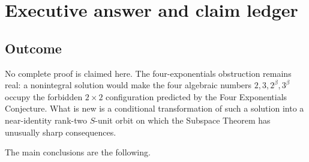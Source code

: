 \documentclass[11pt,oneside]{article}
\theoremstyle{definition}
\theoremstyle{remark}
\begin{document}
\tableofcontents
\clearpage

\section{Executive answer and claim ledger}
\label{sec:executive}

\subsection{Outcome}

No complete proof is claimed here.  The four-exponentials obstruction remains real: a
nonintegral solution would make the four algebraic numbers $2,3,2^\beta,3^\beta$ occupy the
forbidden $2\times2$ configuration predicted by the Four Exponentials Conjecture.  What is
new is a conditional transformation of such a solution into a near-identity rank-two
$S$-unit orbit on which the Subspace Theorem has unusually sharp consequences.

The main conclusions are the following.
\end{document}
